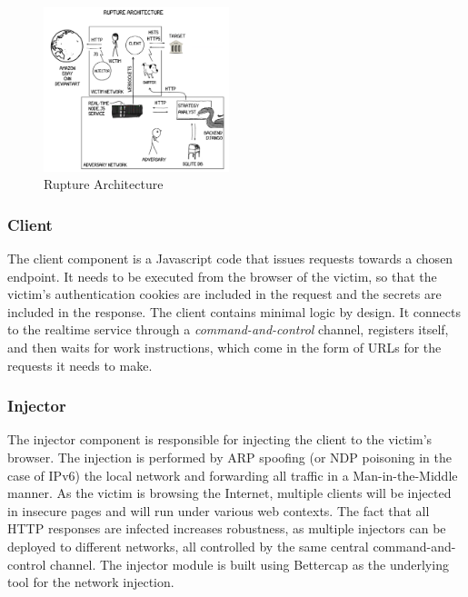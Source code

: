   \begin{figure}[thpb]
      \centering
          \includegraphics[width=0.48\textwidth]{figures/architecture.png}
      \caption{Rupture Architecture}
        \label{fig:rupture_architecture}
   \end{figure}

\subsubsection{Client}

The client component is a Javascript code that issues requests towards a chosen
endpoint. It needs to be executed from the browser of the victim, so that the
victim's authentication cookies are included in the request and the secrets are
included in the response. The client contains minimal logic by design. It
connects to the realtime service through a \textit{command-and-control} channel,
registers itself, and then waits for work instructions, which come in the form
of URLs for the requests it needs to make.

\subsubsection{Injector}

The injector component is responsible for injecting the client to the victim's
browser. The injection is performed by ARP spoofing (or NDP poisoning in the
case of IPv6) the local network and forwarding all traffic in a
Man-in-the-Middle manner. As the victim is browsing the Internet, multiple
clients will be injected in insecure pages and will run under various web contexts.
The fact that all HTTP responses are infected increases robustness,
as multiple injectors can be deployed to different networks, all controlled by the
same central command-and-control channel. The injector module is built using
Bettercap as the underlying tool for the network injection.

